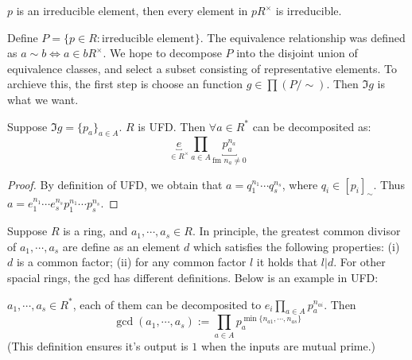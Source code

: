 \begin{corollary}
    $p$ is an irreducible element, then every element in $p R^{\times}$ is irreducible.
\end{corollary}


Define $P = \{ p \in R: \text{irreducible element} \}$. The equivalence relationship was defined as $a \sim b \Leftrightarrow a \in b R^{\times}$. We hope to decompose $P$ into the disjoint union of equivalence classes, and select a subset consisting of representative elements. To archieve this, the first step is choose an function $g \in \prod (P / \sim)$. Then $\Im g$ is what we want.


\begin{proposition}
    Suppose $\Im g = \{ p_a \}_{a \in A}$. $R$ is UFD. Then $\forall a \in R^*$ can be decomposited as:
    \[
        \underbracket{e}_{\in R^{\times}} \prod_{a \in A} \underbracket{p_a^{n_a}}_{\text{fm } n_a \neq 0 } 
    \]
\end{proposition}

\begin{proof}
    By definition of UFD, we obtain that $a = q_1^{n_1} \cdots q_s^{n_s}$, where $q_i \in [p_i]_{\sim}$. Thus $a = e_1^{n_1} \cdots e_s^{n_s} p_1^{n_1} \cdots p_s^{n_s}$.
\end{proof}



Suppose $R$ is a ring, and $a_1, \cdots, a_s \in R$. In principle, the greatest common divisor of $a_1, \cdots, a_s$ are define as an element $d$ which satisfies the following properties: (i) $d$ is a common factor; (ii) for any common factor $l$ it holds that $l | d$. For other spacial rings, the gcd has different definitions. Below is an example in UFD:



\begin{definition}
    $a_1 , \cdots, a_s \in R^*$, each of them can be decomposited to $e_i \prod_{a \in A} p_a^{n_{ai}}$. Then
    \[
        \gcd(a_1, \cdots, a_s) := \prod_{a \in A} p_a^{\min\{ n_{a1}, \cdots, n_{as} \}}
    \]
    (This definition ensures it's output is $1$ when the inputs are mutual prime.)
\end{definition}





